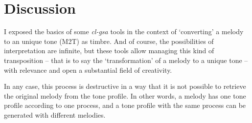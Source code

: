 \section{Discussion}

I exposed the basics of some \textsl{cl-gsa} tools in the context of `converting' a melody to an unique tone (M2T) as timbre. And of course, the possibilities of interpretation are infinite, but these tools allow managing this kind of transposition -- that is to say the `transformation' of a melody to a unique tone -- with relevance and open a substantial field of creativity.

In any case, this process is destructive in a way that it is not possible to retrieve the original melody from the tone profile. In other words, a melody has one tone profile according to one process, and a tone profile with the same process can be generated with different melodies.